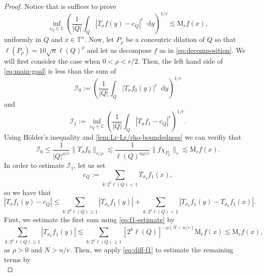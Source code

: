 \documentclass[12pt, reqno]{amsart}
\theoremstyle{definition}
\theoremstyle{remark}
\numberwithin{equation}{section}
\newcommand*\diff{\mathop{}\!\mathrm{d}}
\begin{document}
\begin{proof}
    Notice that is suffices to prove 
    \begin{equation}
        \inf_{c_Q\in \mathbb{C}} \left( 
        \frac{1}{|Q|} \int_Q|T_\sigma f(y) - c_Q|^r\diff y
        \right)^{1/r} \lesssim \mathrm{M}_rf(x) ,
        \label{eq:main-goal}
    \end{equation}
    uniformly in $Q$ and $x\in \mathbb{T}^n$. Now, let $P_\rho$ be a concentric dilation of $Q$ so that $\ell(P_\rho) = 10\sqrt{n}\ell(Q)^\rho$ and let us decompose $f$ as in \cref{eq:decomposition}. We will first consider the case when $0<\rho < r/2$. Then, the left hand side of \cref{eq:main-goal} is less than the sum of 
    \begin{equation*}
        \mathcal{I}_0 := \left( 
        \frac{1}{|Q|} \int_Q|T_\sigma f_0(y)|^r\diff y
        \right)^{1/r}
    \end{equation*}
    and 
    \begin{equation*}
        \mathcal{I}_1 := \inf_{c_Q \in \mathbb{C}} \left(  \frac{1}{|Q|}\int_Q|T_\sigma f_1 - c_Q|^r
        \right)^{1/r}.
    \end{equation*}
    Using H\"older's inequality and \cref{lem:Lr-Lr/rho-boundedness} we can verifiy that 
    \begin{equation*}
        \mathcal{I}_0 \leq \frac{1}{|Q|^{\rho/r}} \|T_\sigma f_0\|_{r/\rho} \lesssim\frac{1}{\ell(Q)^{n\rho/r}} \|f\chi_{P_\rho}\|_r \lesssim\mathrm{M}_rf(x). 
    \end{equation*}
    In order to estimate $\mathcal{I}_1$, let us set 
    \begin{equation}
        c_Q := \sum_{k:2^k\ell(Q)<1} T_{\sigma_k} f_1(x), 
        \label{eq:cQ}
    \end{equation}
    so we have that
    \begin{equation*}
        |T_\sigma f_1(y) - c_Q| \leq \sum_{k:2^k\ell(Q) \geq 1} |T_{\sigma_k}f_1(y)| + \sum_{k:2^k\ell(Q)<1}|T_{\sigma_k} f_1(y) - T_{\sigma_k} f_1(x)|  .
    \end{equation*}
    First, we estimate the first sum using \cref{eq:f1-estimate} by
    \begin{equation*}
        \sum_{k:2^k\ell(Q) \geq 1} |T_{\sigma_k}f_1(y)| \lesssim \sum_{k:2^k\ell(Q) \geq 1} [2^k\ell(Q)]^{-\rho(N-n/r)} \mathrm{M}_rf(x) \lesssim \mathrm{M}_rf(x),
    \end{equation*}
    as $\rho > 0$ and $N > n/r$. Then, we apply \cref{eq:diff-f1} to estimate the remaining terms by 
    \begin{equation*}

\end{equation*}
\end{proof}
\end{document}
